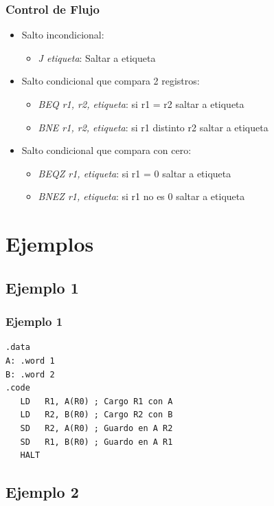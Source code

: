 \documentclass{beamer}
\begin{document}
\begin{frame}
\frametitle{Control de Flujo}
\begin{itemize}

\item Salto incondicional:
\begin{itemize}
\item \emph{J etiqueta}:  Saltar a etiqueta
\end{itemize}

\item Salto condicional que compara 2 registros:
\begin{itemize}
\item \emph{BEQ r1, r2, etiqueta}: si r1 = r2 saltar a etiqueta
\item \emph{BNE r1, r2, etiqueta}: si r1 distinto r2 saltar a etiqueta
\end{itemize}

\item Salto condicional que compara con cero:
\begin{itemize}
\item \emph{BEQZ r1, etiqueta}: si r1 = 0 saltar a etiqueta
\item \emph{BNEZ r1, etiqueta}: si r1 no es 0 saltar a etiqueta
\end{itemize}
\end{itemize}
\end{frame}


\section{Ejemplos}
\subsection{Ejemplo 1}

\begin{frame}[fragile]
\frametitle{Ejemplo 1}
\begin{lstlisting}[language=WinMIPS64,basicstyle=\ttfamily,keywordstyle=\color{blue}]
.data
A: .word 1
B: .word 2
.code
   LD   R1, A(R0) ; Cargo R1 con A
   LD   R2, B(R0) ; Cargo R2 con B
   SD   R2, A(R0) ; Guardo en A R2
   SD   R1, B(R0) ; Guardo en A R1
   HALT
\end{lstlisting}

\end{frame}

\subsection{Ejemplo 2}
\end{document}
